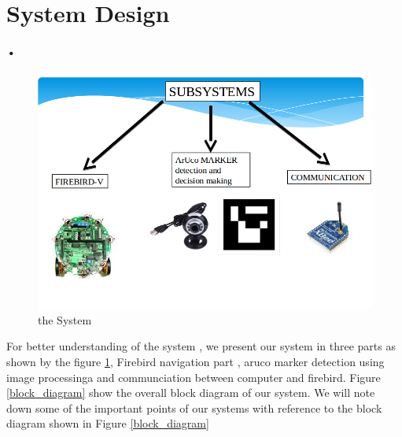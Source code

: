 \documentclass[]{exam}
\begin{document}
\newpage
\section{\color{red} System Design }
\paragraph{•}
\begin{figure}[h!]


 \centering
 
  \includegraphics[scale=0.4]{system.png}
  \caption{the System }
  \label{system}
  \end{figure}
For better understanding of the system , we present our system in three parts as shown by the figure \ref{system},  Firebird navigation part , aruco marker detection using image processinga and communciation between computer and firebird. 
Figure \ref{block_diagram} show the overall block diagram of our system. We will note down some of the important points of our systems with reference to the block diagram shown in Figure \ref{block_diagram} 
\end{document}
